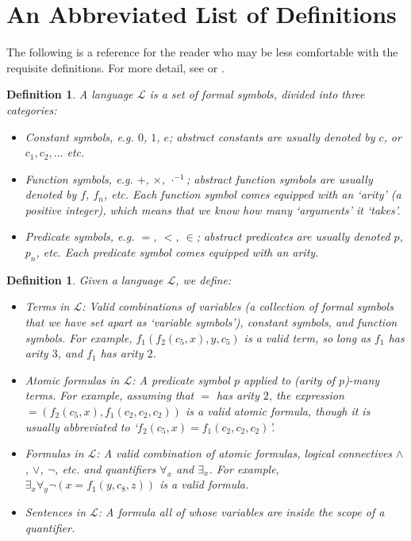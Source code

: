 \documentclass{article}
\newtheorem{definition}[theorem]{Definition}
\theoremstyle{nonumberplain}
\newcommand{\Lang}{\mathcal{L}}
\begin{document}
\appendix

\section{An Abbreviated List of Definitions}\label{appendix:1}

The following is a reference for the reader who may be less comfortable with the requisite definitions. For more detail, see \cite{cnk} or \cite{shoenfield}.

\begin{definition}
A \emph{language} $\Lang$ is a set of formal symbols, divided into three categories:
\begin{itemize}
\item Constant symbols, e.g. $0$, $1$, $e$; abstract constants are usually denoted by $c$, or $c_1, c_2, \dots$ etc.
\item Function symbols, e.g. $+$, $\times$, $\cdot^{-1}$; abstract function symbols are usually denoted by $f$, $f_n$, etc. Each function symbol comes equipped with an `arity' (a positive integer), which means that we know how many `arguments' it `takes'.
\item Predicate symbols, e.g. $=$, $<$, $\in$; abstract predicates are usually denoted $p$, $p_n$, etc. Each predicate symbol comes equipped with an arity.
\end{itemize}
\end{definition}

\begin{definition}\label{def:formula}
Given a language $\Lang$, we define:
\begin{itemize}
\item Terms in $\Lang$: Valid combinations of variables (a collection of formal symbols that we have set apart as `variable symbols'), constant symbols, and function symbols. For example, $f_1(f_2(c_5, x), y, c_5)$ is a valid term, so long as $f_1$ has arity $3$, and $f_1$ has arity $2$.

\item Atomic formulas in $\Lang$: A predicate symbol $p$ applied to (arity of $p$)-many terms. For example, assuming that $=$ has arity $2$, the expression $=(f_2(c_5,x), f_1(c_2,c_2,c_2))$ is a valid atomic formula, though it is usually abbreviated to `$f_2(c_5,x) = f_1(c_2,c_2,c_2)$'.

\item Formulas in $\Lang$: A valid combination of atomic formulas, logical connectives $\land$, $\lor$, $\neg$, etc. and quantifiers $\forall_x$ and $\exists_x$. For example, $\exists_x \forall_y \neg(x = f_1(y, c_8,z))$ is a valid formula.

\item Sentences in $\Lang$: A formula all of whose variables are inside the scope of a quantifier.
\end{itemize}
\end{definition}
\end{document}

